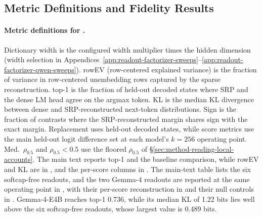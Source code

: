 \subsection{Metric Definitions and Fidelity Results}
\label{app:robustness-key-quantitative}

\paragraph{Metric definitions for .}
\label{app:fidelity-table-notes}
Dictionary width is the configured width multiplier times the hidden dimension (width
selection in
Appendices~\ref{app:readout-factorizer-sweeps}--\ref{app:readout-factorizer-qwen-sweeps}).
rowEV (row-centered explained variance) is the fraction of variance in
row-centered unembedding rows captured by the sparse reconstruction.
top-1 is the fraction of held-out decoded states where SRP and the dense
LM head agree on the argmax token. KL is the median KL divergence
between dense and SRP-reconstructed next-token distributions. Sign is
the fraction of contrasts where the SRP-reconstructed margin shares
sign with the exact margin. Replacement uses held-out decoded states, while
score metrics use the main held-out logit difference set at each
model's \(k=256\) operating point. Med.\ \(\rho_{0.5}\) and \(\rho_{0.5}<0.5\) use
the floored \(\rho_{0.5}\) of \S\ref{sec:method-reading-local-accounts}. The
main text reports top-1 and the baseline comparison, while rowEV and KL are in
, and the per-score columns in
. The main-text table lists the six
softcap-free readouts, and the two Gemma-4 readouts are reported at the
same operating point in
, with their per-score reconstruction in
 and their null controls in
. Gemma-4-E4B reaches top-1 0.736,
while its median KL of 1.22 bits lies
well above the six softcap-free readouts, whose largest value is 0.489 bits.

